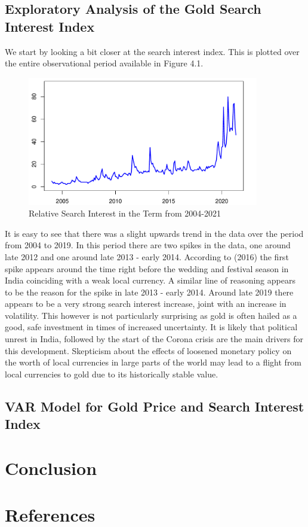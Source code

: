\documentclass[a4paper]{article}
\theoremstyle{definition}
\begin{document}
\subsection{Exploratory Analysis of the Gold Search Interest Index}
We start by looking a bit closer at the search interest index. This is plotted over the entire observational period available in Figure 4.1.
	\begin{figure}[!t]
	\centering
	\caption{Relative Search Interest in the Term  from 2004-2021}
	\includegraphics[width=0.90\textwidth]{GoldSearchAlone}
	\end{figure}
It is easy to see that there was a slight upwards trend in the data over the period from 2004 to 2019. In this period there are two spikes in the data, one around late 2012 and one around late 2013 - early 2014. According to \citeauthor{Desk.24062016} (2016) the first spike appears around the time right before the wedding and festival season in India coinciding with a weak local currency. A similar line of reasoning appears to be the reason for the spike in late 2013 - early 2014. Around late 2019 there appears to be a very strong search interest increase, joint with an increase in volatility. This however is not particularly surprising as gold is often hailed as a good, safe investment in times of increased uncertainty. It is likely that political unrest in India, followed by the start of the Corona crisis are the main drivers for this development. Skepticism about the effects of loosened monetary policy on the worth of local currencies in large parts of the world may lead to a flight from local currencies to gold due to its historically stable value. 
%

\subsection{VAR Model for Gold Price and Search Interest Index}
%
\newpage
\section{Conclusion}
%
%
%
%
%
%
%
%
\newpage
{}
\section*{References}
\printbibliography
\end{document}
